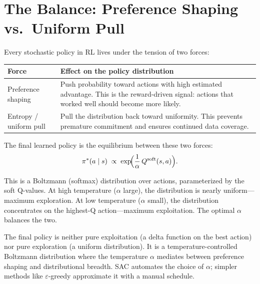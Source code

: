 \section{The Balance: Preference Shaping vs.\ Uniform Pull}
\label{sec:balance}

Every stochastic policy in RL lives under the tension of two forces:

\begin{center}
\begin{tabular}{@{} l p{8cm} @{}}
\toprule
\textbf{Force} & \textbf{Effect on the policy distribution} \\
\midrule
Preference shaping & Push probability toward actions with high estimated advantage. This is the reward-driven signal: actions that worked well should become more likely. \\
Entropy / uniform pull & Pull the distribution back toward uniformity. This prevents premature commitment and ensures continued data coverage. \\
\bottomrule
\end{tabular}
\end{center}

The final learned policy is the equilibrium between these two forces:
\begin{equation}
  \pi^*(a \mid s) \;\propto\; \exp\!\Bigl(\frac{1}{\alpha}\,Q^{\text{soft}}(s, a)\Bigr).
  \label{eq:boltzmann}
\end{equation}

This is a Boltzmann (softmax) distribution over actions, parameterized by the soft Q-values. At high temperature ($\alpha$ large), the distribution is nearly uniform---maximum exploration. At low temperature ($\alpha$ small), the distribution concentrates on the highest-Q action---maximum exploitation. The optimal $\alpha$ balances the two.

\begin{keyidea}
The final policy is neither pure exploitation (a delta function on the best action) nor pure exploration (a uniform distribution). It is a temperature-controlled Boltzmann distribution where the temperature $\alpha$ mediates between preference shaping and distributional breadth. SAC automates the choice of $\alpha$; simpler methods like $\varepsilon$-greedy approximate it with a manual schedule.
\end{keyidea}

